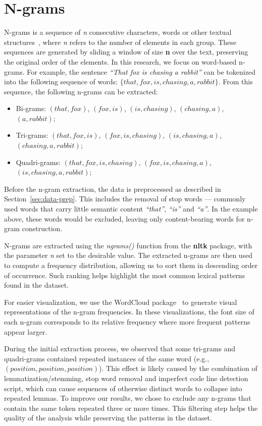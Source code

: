 \section{N-grams} \label{sec:ngrams-method}
N-grams is a sequence of \textit{n} consecutive characters, words or other textual structures~\cite{n-grams}, where \textit{n} refers to the number of elements in each group. These sequences are generated by sliding a window of size \textbf{n} over the text, preserving the original order of the elements. In this research, we focus on word-based n-grams. For example, the sentence \textit{``That fox is chasing a rabbit''} can be tokenized into the following sequence of words: $\{that, fox, is, chasing, a, rabbit\}$. From this sequence, the following n-grams can be extracted:
\begin{itemize}
    \item Bi-grams: $(that, fox)$, $(fox, is)$, $(is, chasing)$, $(chasing, a)$, $(a, rabbit)$; 
    \item Tri-grams: $(that, fox, is)$, $(fox, is, chasing)$, $(is, chasing, a)$, \\$(chasing, a, rabbit)$;
    \item Quadri-grams: $(that, fox, is, chasing)$, $(fox, is, chasing, a)$, \\$(is, chasing, a, rabbit)$;
\end{itemize}

Before the n-gram extraction, the data is preprocessed as described in Section~\ref{sec:data-prep}. This includes the removal of stop words --- commonly used words that carry little semantic content \textit{``that''}, \textit{``is''} and \textit{``a''}. In the example above, these words would be excluded, leaving only content-bearing words for n-gram construction. 

N-grams are extracted using the \textit{ngrams()} function from the \textbf{nltk} package, with the parameter \textit{n} set to the desirable value. The extracted n-grams are then used to compute a frequency distribution, allowing us to sort them in descending order of occurrence. Such ranking helps highlight the most common lexical patterns found in the dataset.

For easier visualization, we use the WordCloud package~\cite{wordcloud} to generate visual representations of the n-gram frequencies. In these visualizations, the font size of each n-gram corresponds to its relative frequency where more frequent patterns appear larger.

During the initial extraction process, we observed that some tri-grams and quadri-grams contained repeated instances of the same word (e.g., \linebreak $(position, position, position)$). This effect is likely caused by the combination of lemmatization/stemming, stop word removal and imperfect code line detection script, which can cause sequences of otherwise distinct words to collapse into repeated lemmas. To improve our results, we chose to exclude any n-grams that contain the same token repeated three or more times. This filtering step helps the quality of the analysis while preserving the patterns in the dataset.

